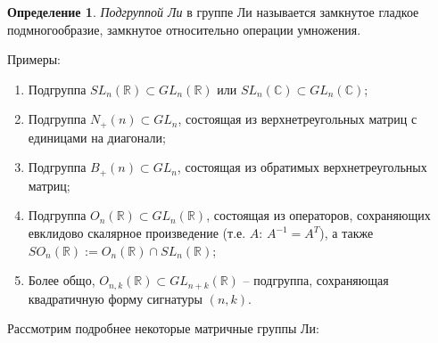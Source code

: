 \documentclass[12pt]{article}
\theoremstyle{definition}
\newtheorem{defin}[theorem]{Определение}
\begin{document}
\begin{defin}
\textit{Подгруппой Ли} в группе Ли называется замкнутое гладкое подмногообразие, замкнутое относительно операции умножения.
\end{defin}
Примеры:
\begin{enumerate}
    \item Подгруппа $SL_n(\mathbb{R}) \subset GL_n(\mathbb{R})$ или $SL_n(\mathbb{C}) \subset GL_n(\mathbb{C})$;
    \item Подгруппа $N_+(n)\subset GL_n$, состоящая из верхнетреугольных матриц с единицами на диагонали;
    \item Подгруппа $B_+(n) \subset GL_n$, состоящая из обратимых верхнетреугольных матриц;
    \item Подгруппа $O_n(\mathbb{R}) \subset GL_n(\mathbb{R})$, состоящая из операторов, сохраняющих евклидово скалярное произведение (т.е. $A$: $A^{-1} = A^T$), а также $SO_n(\mathbb{R}) := O_n(\mathbb{R}) \cap SL_n(\mathbb{R})$;
    \item Более общо, $O_{n,k}(\mathbb{R}) \subset GL_{n+k}(\mathbb{R})$ -- подгруппа, сохраняющая квадратичную форму сигнатуры $(n, k)$.
\end{enumerate}
Рассмотрим подробнее некоторые матричные группы Ли:
\end{document}
